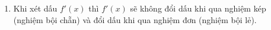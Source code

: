\begin{note}
	\begin{enumerate}[\iconCH]
		\item Khi xét dấu $f'(x)$ thì $f'(x)$ sẽ không đổi dấu khi qua nghiệm kép (nghiệm bội chẵn) và đổi dấu khi qua nghiệm đơn (nghiệm bội lẻ).
	\end{enumerate}
\end{note}

